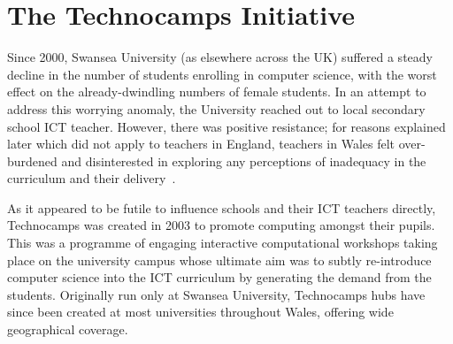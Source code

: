 \documentclass{llncs}
\begin{document}




\section{The Technocamps Initiative}\label{technocamps}

Since 2000, Swansea University (as elsewhere across the UK) suffered a
steady decline in the number of students enrolling in computer
science, with the worst effect on the already-dwindling numbers of
female students.  In an attempt to address this worrying anomaly, the
University reached out to local secondary school ICT teacher.
However, there was positive resistance; for reasons explained later
which did not apply to teachers in England, teachers in Wales felt
over-burdened and disinterested in exploring any perceptions of
inadequacy in the curriculum and their
delivery~\cite{crick+sentance:2011,brown-et-al-sigcse2012}.

As it appeared to be futile to influence schools and their ICT
teachers directly, Technocamps was created in 2003 to promote
computing amongst their pupils.  This was a programme of engaging
interactive computational workshops taking place on the university
campus whose ultimate aim was to subtly re-introduce computer science
into the ICT curriculum by generating the demand from the students.
Originally run only at Swansea University, Technocamps hubs have since
been created at most universities throughout Wales, offering wide
geographical coverage.
\end{document}
